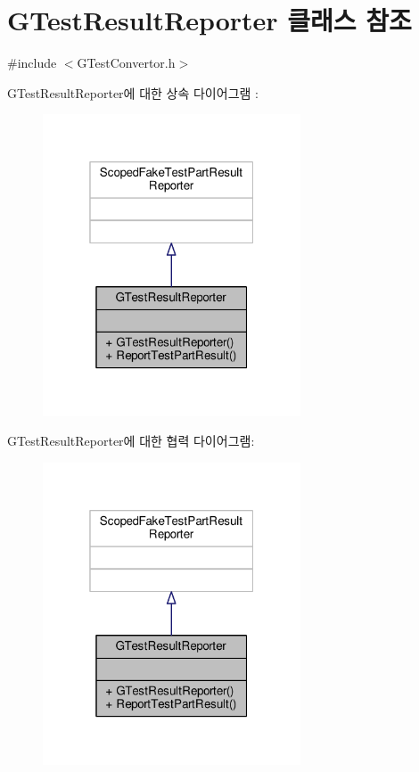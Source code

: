 \hypertarget{class_g_test_result_reporter}{}\section{G\+Test\+Result\+Reporter 클래스 참조}
\label{class_g_test_result_reporter}


{\ttfamily \#include $<$G\+Test\+Convertor.\+h$>$}



G\+Test\+Result\+Reporter에 대한 상속 다이어그램 \+: 
\nopagebreak
\begin{figure}[H]
\begin{center}
\leavevmode
\includegraphics[width=217pt]{class_g_test_result_reporter__inherit__graph}
\end{center}
\end{figure}


G\+Test\+Result\+Reporter에 대한 협력 다이어그램\+:
\nopagebreak
\begin{figure}[H]
\begin{center}
\leavevmode
\includegraphics[width=217pt]{class_g_test_result_reporter__coll__graph}
\end{center}
\end{figure}
